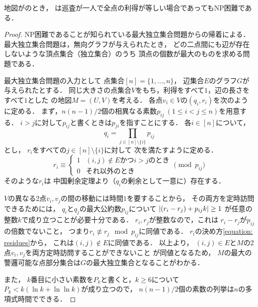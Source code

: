 \begin{theo}
  \label{theo:UnitExacIdletimeNPhard}
  地図が{\graphUnit}のとき，
  {\timeSpecifiedPPProfit}は巡査が一人で全点の利得が等しい場合であってもNP困難である．
\end{theo}
\begin{proof}
  NP困難であることが知られている最大独立集合問題からの帰着による．
  最大独立集合問題は，無向グラフが与えられたとき，
  どの二点間にも辺が存在しないような頂点集合（独立集合）のうち
  頂点の個数が最大のものを求める問題である．

  \newcommand{\primenum}[2]{p_{{#1}{#2}}}
  最大独立集合問題の入力として
  点集合$[n] = \{1, \ldots, n\}$，
  辺集合$E$のグラフ$G$が与えられたとする．
  同じ大きさの点集合$V$をもち，利得をすべて$1$，辺の長さをすべて$1$とした
  {\graphUnit}の地図$M = (U, V)$を考える．
  各点$v_i \in V$の{\exactTime}$(q_i, r_i)$を次のように定める．
  まず，$n(n - 1)/2$個の相異なる素数$\primenum{i}{j}\ (1 \leq i < j \leq n)$を用意する．
  $i > j$に対して$\primenum{i}{j}$と書くときは$\primenum{j}{i}$を指すことにする．
  各$i \in [n]$について，
  \begin{equation}
    q_i = \prod_{j \in [n] \setminus \{i\}} \primenum{i}{j}
  \end{equation}
  とし，
  $r _i$をすべての$j \in [n] \setminus \{i\}$に対して
  次を満たすように定める．
  \begin{equation}
    \label{equation: residues}
    r _i
    \equiv
    \begin{cases}
      1 & \text{$(i, j) \notin E$かつ$i > j$のとき} \\
      0 & \text{それ以外のとき}
    \end{cases}
    \pmod{\primenum{i}{j}}
  \end{equation}
  そのような$r _i$は
  中国剰余定理より（$q _i$の剰余として一意に）存在する．

  $V$の異なる2点$v_i, v_j$の間の移動には時間$1$を要することから，
  その両方を定時訪問できるためには，
  $q_i$と$q_j$の最大公約数$\primenum{i}{j}$について
  $\abs{(r_i - r_j) + \primenum{i}{j} k} \geq 1$%
  が任意の整数$k$で成り立つことが必要十分である．
  $r_i, r_j$が整数なので，これは
  $r_i - r_j$が$\primenum{i}{j}$の倍数でないこと，
  つまり$r_i \not\equiv r_j \mod \primenum{i}{j}$に同値である．
  $r_i$の決め方\eqref{equation: residues}から，
  これは$(i, j) \notin E$に同値である．
  以上より，
  $(i, j) \in E$と$M$の2点$v_i, v_j$を両方定時訪問することができないこと
  が同値となるため，
  $M$の最大の警邏可能な点部分集合は$G$の最大独立集合となることがわかる．

  また，
  $k$番目に小さい素数を$P_k$と書くと，$k \geq 6$について
  $P_k < k( \ln k + \ln\ln k )$が成り立つ\cite{dusart1999k}ので，
  $n(n - 1)/2$個の素数の列挙は$n$の多項式時間でできる．
\end{proof}

